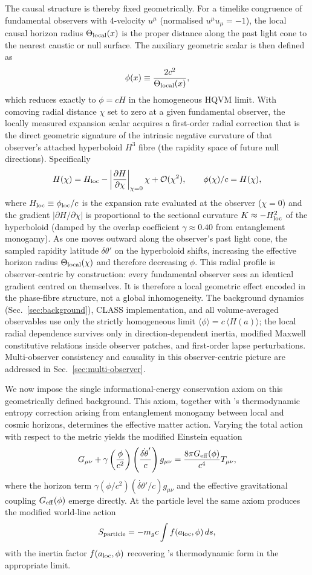 \documentclass[12pt,a4paper]{article}
\begin{document}
The causal structure is thereby fixed geometrically. For a timelike congruence of fundamental observers with 4-velocity $u^\mu$ (normalised $u^\mu u_\mu = -1$), the local causal horizon radius $\Theta_{\rm local}(x)$ is the proper distance along the past light cone to the nearest caustic or null surface. The auxiliary geometric scalar is then defined as
\[
\phi(x) \equiv \frac{2c^2}{\Theta_{\rm local}(x)},
\]
which reduces exactly to $\phi = cH$ in the homogeneous HQVM limit. With comoving radial distance $\chi$ set to zero at a given fundamental observer, the locally measured expansion scalar acquires a first-order radial correction that is the direct geometric signature of the intrinsic negative curvature of that observer's attached hyperboloid $H^3$ fibre (the rapidity space of future null directions). Specifically
\[
H(\chi) = H_{\rm loc} - \left|\frac{\partial H}{\partial \chi}\right|_{\chi=0} \chi + \mathcal{O}(\chi^2),
\qquad
\phi(\chi)/c = H(\chi),
\]
where $H_{\rm loc} \equiv \phi_{\rm loc}/c$ is the expansion rate evaluated at the observer ($\chi = 0$) and the gradient $\left|\partial H/\partial \chi\right|$ is proportional to the sectional curvature $K \approx -H_{\rm loc}^2$ of the hyperboloid (damped by the overlap coefficient $\gamma \approx 0.40$ from entanglement monogamy). As one moves outward along the observer's past light cone, the sampled rapidity latitude $\delta\theta'$ on the hyperboloid shifts, increasing the effective horizon radius $\Theta_{\rm local}(\chi)$ and therefore decreasing $\phi$. This radial profile is observer-centric by construction: every fundamental observer sees an identical gradient centred on themselves. It is therefore a local geometric effect encoded in the phase-fibre structure, not a global inhomogeneity. The background dynamics (Sec.~\ref{sec:background}), CLASS implementation, and all volume-averaged observables use only the strictly homogeneous limit $\langle \phi \rangle = c\,\langle H(a) \rangle$; the local radial dependence survives only in direction-dependent inertia, modified Maxwell constitutive relations inside observer patches, and first-order lapse perturbations. Multi-observer consistency and causality in this observer-centric picture are addressed in Sec.~\ref{sec:multi-observer}.

We now impose the single informational-energy conservation axiom on this geometrically defined background. This axiom, together with \citet{brodie2026}'s thermodynamic entropy correction arising from entanglement monogamy between local and cosmic horizons, determines the effective matter action. Varying the total action with respect to the metric yields the modified Einstein equation
\[
G_{\mu\nu} + \gamma \left( \frac{\phi}{c^2} \right) \left( \frac{\dot{\delta\theta}'}{c} \right) g_{\mu\nu} = \frac{8\pi G_{\rm eff}(\phi)}{c^4} T_{\mu\nu},
\]
where the horizon term $\gamma (\phi/c^2)(\dot{\delta\theta}'/c) g_{\mu\nu}$ and the effective gravitational coupling $G_{\rm eff}(\phi)$ emerge directly. At the particle level the same axiom produces the modified world-line action
\[
S_{\rm particle} = -m_g c \int f(a_{\rm loc},\phi) \, ds,
\]
with the inertia factor $f(a_{\rm loc},\phi)$ recovering \citet{brodie2026}'s thermodynamic form in the appropriate limit.
\end{document}
